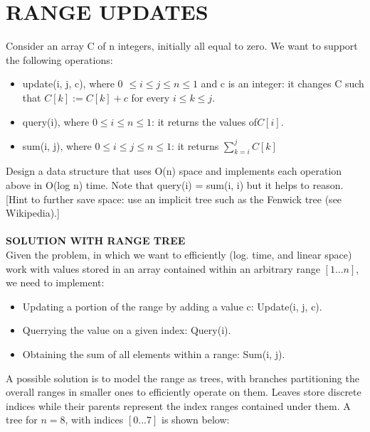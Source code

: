 \documentclass[a4paper]{article}
\begin{document}
\section*{RANGE UPDATES}
Consider an array C of n integers, initially all equal to zero. We want to support the following operations:
\begin{itemize}
\item update(i, j, c), where 0 $\leq i \leq j \leq n \leq 1$ and c is an integer: it changes C such
that $C[k] := C[k] + c$ for every $i \leq k \leq j$.
\item query(i), where $0 \leq i \leq n \leq 1$: it returns the values of$ C[i]$.
\item sum(i, j), where $0 \leq i \leq j \leq n \leq 1$: it returns $\sum_{k=i}^{j} C[k]$
\end{itemize}
Design a data structure that uses O(n) space and implements each operation above in O(log n) time. Note that query(i) = sum(i, i) but it helps to reason. [Hint to further save space: use an implicit tree such as the Fenwick tree (see Wikipedia).]\\
\\
\textbf{SOLUTION WITH RANGE TREE}
\\
Given the problem, in which we want to efficiently (log. time, and linear
space) work with values stored in an array contained within an arbitrary
range \([1...n]\), we need to implement:

\begin{itemize}
\item
  Updating a portion of the range by adding a value c: Update(i, j, c).
\item
  Querrying the value on a given index: Query(i).
\item
  Obtaining the sum of all elements within a range: Sum(i, j).
\end{itemize}

A possible solution is to model the range as trees, with branches
partitioning the overall ranges in smaller ones to efficiently operate
on them. Leaves store discrete indices while their parents represent the
index ranges contained under them. A tree for \(n=8\), with indices
\([0...7]\) is shown below:
\end{document}
